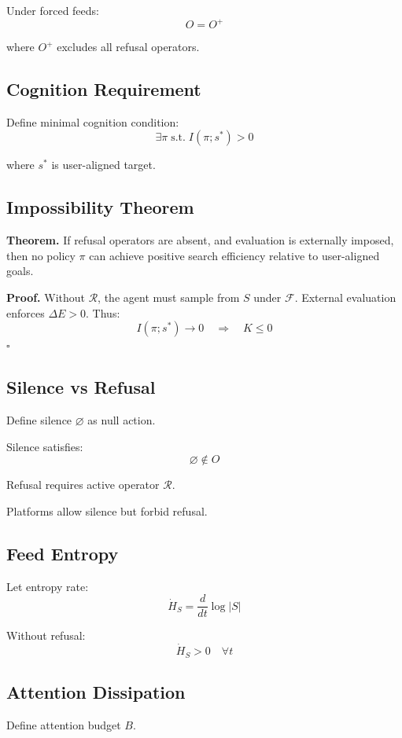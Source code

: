 \documentclass[12pt]{article}
\begin{document}
Under forced feeds:
\[
O = O^{+}
\]

where $O^{+}$ excludes all refusal operators.

\subsection{Cognition Requirement}

Define minimal cognition condition:
\[
\exists \pi \; \text{s.t.} \; I(\pi; s^*) > 0
\]

where $s^*$ is user-aligned target.

\subsection{Impossibility Theorem}

\textbf{Theorem.}
If refusal operators are absent, and evaluation is externally imposed, then no policy $\pi$ can achieve positive search efficiency relative to user-aligned goals.

\textbf{Proof.}
Without $\mathcal{R}$, the agent must sample from $S$ under $\mathcal{F}$.
External evaluation enforces $\Delta E > 0$.
Thus:
\[
I(\pi; s^*) \to 0
\quad\Rightarrow\quad
K \leq 0
\]
\hfill $\square$

\subsection{Silence vs Refusal}

Define silence $\varnothing$ as null action.

Silence satisfies:
\[
\varnothing \notin O
\]

Refusal requires active operator $\mathcal{R}$.

Platforms allow silence but forbid refusal.

\subsection{Feed Entropy}

Let entropy rate:
\[
\dot{H}_S = \frac{d}{dt} \log |S|
\]

Without refusal:
\[
\dot{H}_S > 0 \quad \forall t
\]

\subsection{Attention Dissipation}

Define attention budget $B$.
\end{document}
